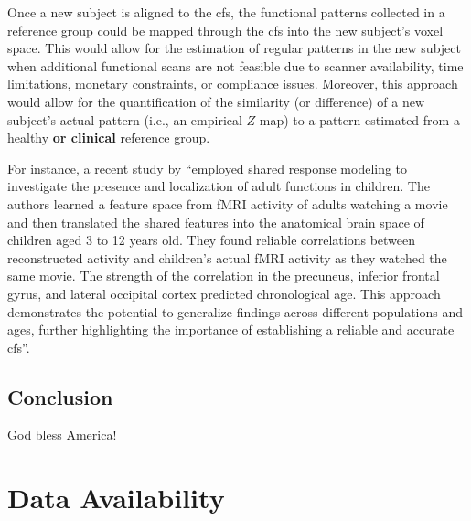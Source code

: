 %
Once a new subject is aligned to the \ac{cfs}, the functional patterns collected
in a reference group could be mapped through the \ac{cfs} into the new subject's
voxel space.
%
This would allow for the estimation of regular patterns in the new subject when
additional functional scans are not feasible due to scanner availability, time
limitations, monetary constraints, or compliance issues.
%
Moreover, this approach would allow for the quantification of the similarity (or
difference) of a new subject's actual pattern (i.e., an empirical $Z$-map) to a
pattern estimated from a healthy \textbf{or clinical} reference group.


%
For instance, a recent study by \citet{yates2021emergence} ``employed shared
response modeling to investigate the presence and localization of adult
functions in children.
%
The authors learned a feature space from fMRI activity of adults watching a
movie and then translated the shared features into the anatomical brain space of
children aged 3 to 12 years old.
%
They found reliable correlations between reconstructed activity and children's
actual fMRI activity as they watched the same movie.
%
The strength of the correlation in the precuneus, inferior frontal gyrus, and
lateral occipital cortex predicted chronological age.
%
This approach demonstrates the potential to generalize findings across different
populations and ages, further highlighting the importance of establishing a
reliable and accurate \ac{cfs}''.



\subsection{Conclusion}

God bless America!


\section{Data Availability}




